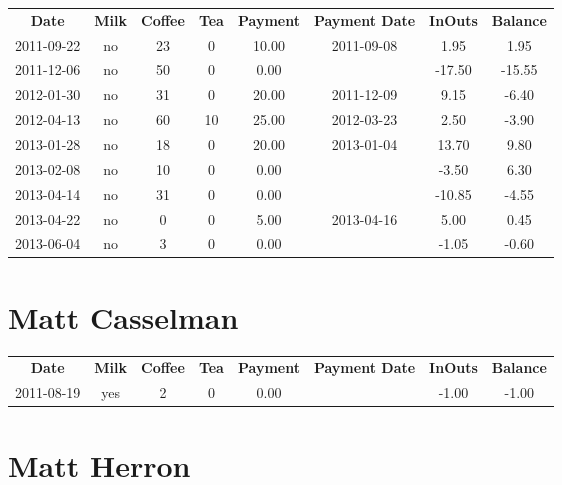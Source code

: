 \begin{center}
\begin{tabular}{cccccccc}
\textbf{Date} & \textbf{Milk} & \textbf{Coffee} & \textbf{Tea} & \textbf{Payment} & \textbf{Payment Date} & \textbf{InOuts} & \textbf{Balance} \\
2011-09-22 & no & 23 &  0 & 10.00 & 2011-09-08 &   1.95 &   1.95\\ 
2011-12-06 & no & 50 &  0 &  0.00 &  & -17.50 & -15.55\\ 
2012-01-30 & no & 31 &  0 & 20.00 & 2011-12-09 &   9.15 &  -6.40\\ 
2012-04-13 & no & 60 & 10 & 25.00 & 2012-03-23 &   2.50 &  -3.90\\ 
2013-01-28 & no & 18 &  0 & 20.00 & 2013-01-04 &  13.70 &   9.80\\ 
2013-02-08 & no & 10 &  0 &  0.00 &  &  -3.50 &   6.30\\ 
2013-04-14 & no & 31 &  0 &  0.00 &  & -10.85 &  -4.55\\ 
2013-04-22 & no &  0 &  0 &  5.00 & 2013-04-16 &   5.00 &   0.45\\ 
2013-06-04 & no &  3 &  0 &  0.00 &  &  -1.05 &  -0.60
\end{tabular}
\end{center}

\section{Matt Casselman}

\begin{center}
\begin{tabular}{cccccccc}
\textbf{Date} & \textbf{Milk} & \textbf{Coffee} & \textbf{Tea} & \textbf{Payment} & \textbf{Payment Date} & \textbf{InOuts} & \textbf{Balance} \\
2011-08-19 & yes & 2 & 0 & 0.00 &  & -1.00 & -1.00
\end{tabular}
\end{center}

\section{Matt Herron}

